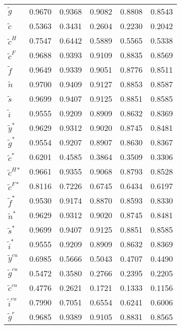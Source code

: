 \begin{center}
\begin{longtable}{lccccc}
${\tilde g}            $	 & 	    0.9670	 & 	    0.9368	 & 	    0.9082	 & 	    0.8808	 & 	    0.8543 \\ 
${\tilde c}            $	 & 	    0.5363	 & 	    0.3431	 & 	    0.2604	 & 	    0.2230	 & 	    0.2042 \\ 
${\tilde c^H}          $	 & 	    0.7547	 & 	    0.6442	 & 	    0.5889	 & 	    0.5565	 & 	    0.5338 \\ 
${\tilde c^F}          $	 & 	    0.9688	 & 	    0.9393	 & 	    0.9109	 & 	    0.8835	 & 	    0.8569 \\ 
${\tilde f}            $	 & 	    0.9649	 & 	    0.9339	 & 	    0.9051	 & 	    0.8776	 & 	    0.8511 \\ 
${\tilde n}            $	 & 	    0.9700	 & 	    0.9409	 & 	    0.9127	 & 	    0.8853	 & 	    0.8587 \\ 
${\tilde s}            $	 & 	    0.9699	 & 	    0.9407	 & 	    0.9125	 & 	    0.8851	 & 	    0.8585 \\ 
${\tilde i}            $	 & 	    0.9555	 & 	    0.9209	 & 	    0.8909	 & 	    0.8632	 & 	    0.8369 \\ 
${\tilde y^*}          $	 & 	    0.9629	 & 	    0.9312	 & 	    0.9020	 & 	    0.8745	 & 	    0.8481 \\ 
${\tilde g^*}          $	 & 	    0.9554	 & 	    0.9207	 & 	    0.8907	 & 	    0.8630	 & 	    0.8367 \\ 
${\tilde c^*}          $	 & 	    0.6201	 & 	    0.4585	 & 	    0.3864	 & 	    0.3509	 & 	    0.3306 \\ 
${\tilde c^{H*}}       $	 & 	    0.9661	 & 	    0.9355	 & 	    0.9068	 & 	    0.8793	 & 	    0.8528 \\ 
${\tilde c^{F*}}       $	 & 	    0.8116	 & 	    0.7226	 & 	    0.6745	 & 	    0.6434	 & 	    0.6197 \\ 
${\tilde f^*}          $	 & 	    0.9530	 & 	    0.9174	 & 	    0.8870	 & 	    0.8593	 & 	    0.8330 \\ 
${\tilde n^*}          $	 & 	    0.9629	 & 	    0.9312	 & 	    0.9020	 & 	    0.8745	 & 	    0.8481 \\ 
${\tilde s^*}          $	 & 	    0.9699	 & 	    0.9407	 & 	    0.9125	 & 	    0.8851	 & 	    0.8585 \\ 
${\tilde i^*}          $	 & 	    0.9555	 & 	    0.9209	 & 	    0.8909	 & 	    0.8632	 & 	    0.8369 \\ 
${\tilde y^{cu}}       $	 & 	    0.6985	 & 	    0.5666	 & 	    0.5043	 & 	    0.4707	 & 	    0.4490 \\ 
${\tilde g^{cu}}       $	 & 	    0.5472	 & 	    0.3580	 & 	    0.2766	 & 	    0.2395	 & 	    0.2205 \\ 
${\tilde c^{cu}}       $	 & 	    0.4776	 & 	    0.2621	 & 	    0.1721	 & 	    0.1333	 & 	    0.1156 \\ 
${\tilde i^{cu}}       $	 & 	    0.7990	 & 	    0.7051	 & 	    0.6554	 & 	    0.6241	 & 	    0.6006 \\ 
${\tilde g^{r}}        $	 & 	    0.9685	 & 	    0.9389	 & 	    0.9105	 & 	    0.8831	 & 	    0.8565 \\ 
\end{longtable}
 \end{center}
